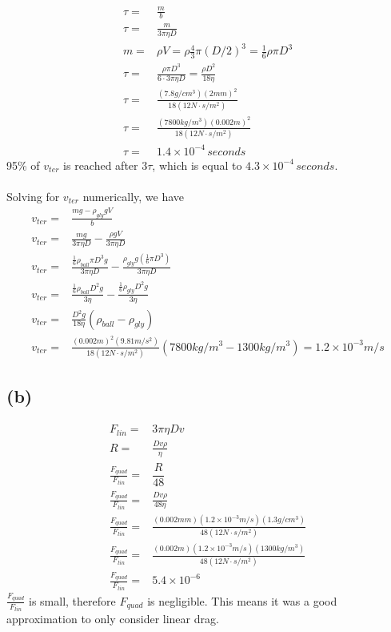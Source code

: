 \documentclass[12pt, a4paper]{article}
\begin{document}
\begin{align*}
\tau =& \frac{m}{b}
\\
\tau =& \frac{m}{3\pi\eta D}
\\
m =& \rho V = \rho \frac{4}{3}\pi (D/2)^3 = \frac{1}{6}\rho\pi D^3
\\
\tau =& \frac{\rho\pi D^3}{6 \cdot 3\pi\eta D} = \boxed{\frac{\rho D^2}{18\eta}}
\\
\tau =& \frac{(7.8g/cm^3) (2mm)^2}{18(12N\cdot s/m^2)}
\\
\tau =& \frac{(7800kg/m^3) (0.002m)^2}{18(12N\cdot s/m^2)}
\\
\tau =& \boxed{1.4\times10^{-4} \, seconds}
\end{align*}
95\% of $v_{ter}$ is reached after $3\tau$, which is equal to $\boxed{4.3\times10^{-4} \, seconds}$. \\
\\
Solving for $v_{ter}$ numerically, we have
\begin{align*}
v_{ter} =& \frac{mg - \rho_{gly} gV}{b}
\\
v_{ter} =& \frac{mg}{3\pi\eta D} - \frac{\rho gV}{3\pi\eta D}
\\
v_{ter} =& \frac{\tfrac{1}{6}\rho_{ball}\pi D^3 g}{3\pi\eta D} - \frac{\rho_{gly} g(\tfrac{1}{6}\pi D^3)}{3\pi\eta D}
\\
v_{ter} =& 
\frac{\tfrac{1}{6}\rho_{ball} D^2 g}{3\eta } - 
\frac{\tfrac{1}{6}\rho_{gly } D^2 g}{3\eta }
\\
v_{ter} =& 
\frac{D^2 g}{18\eta } (\rho_{ball}-\rho_{gly }) 
\\
v_{ter} =& 
\frac{(0.002m)^2 (9.81m/s^2)}{18(12N\cdot s/m^2) } 
(7800kg/m^3 - 1300kg/m^3) = \boxed{1.2\times10^{-3}m/s}
\end{align*}
\subsection*{(b)}
\begin{align*}
F_{lin} =& 3\pi \eta D v
\\
R =& \frac{Dv\rho}{\eta}
\\
\frac{F_{quad}}{F_{lin}} =& \dfrac{R}{48}
\\
\frac{F_{quad}}{F_{lin}} =& \frac{Dv\rho}{48\eta}
\\
\frac{F_{quad}}{F_{lin}} =& \frac{(0.002mm)(1.2\times10^{-3}m/s)(1.3g/cm^3)}{48(12N\cdot s/m^2)}
\\
\frac{F_{quad}}{F_{lin}} =& \frac{(0.002m)(1.2\times10^{-3}m/s)(1300kg/m^3)}{48(12N\cdot s/m^2)}
\\
\frac{F_{quad}}{F_{lin}} =& \boxed{5.4\times10^{-6}}
\end{align*}
$\frac{F_{quad}}{F_{lin}}$ is small, therefore $F_{quad}$ is negligible. This means it was a good approximation to only consider linear drag. 
\end{document}
